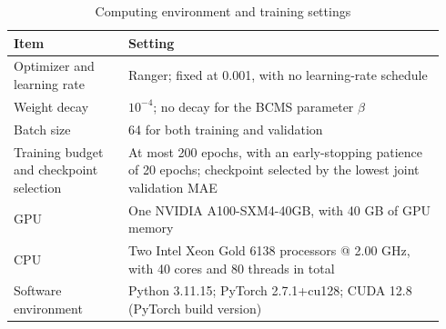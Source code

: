\begin{table}[!htbp]
  \centering
  \caption[RBSRN computing environment and training settings]{Computing environment and training settings}
  \label{tab:hyperparameter-implementation}
  \small
  \renewcommand{\arraystretch}{1.12}
  \begin{tabular}{@{}p{0.25\linewidth}p{0.69\linewidth}@{}}
    \toprule
    Item & Setting \\
    \midrule
    Optimizer and learning rate & Ranger; fixed at 0.001, with no learning-rate schedule \\
    Weight decay & \(10^{-4}\); no decay for the BCMS parameter \(\beta\) \\
    Batch size & 64 for both training and validation \\
    Training budget and checkpoint selection & At most 200 epochs, with an early-stopping patience of 20 epochs; checkpoint selected by the lowest joint validation MAE \\
    \midrule
    GPU & One NVIDIA A100-SXM4-40GB, with 40 GB of GPU memory \\
    CPU & Two Intel Xeon Gold 6138 processors @ 2.00 GHz, with 40 cores and 80 threads in total \\
    Software environment & Python 3.11.15; PyTorch 2.7.1+cu128; CUDA 12.8 (PyTorch build version) \\
    \bottomrule
  \end{tabular}
\end{table}
